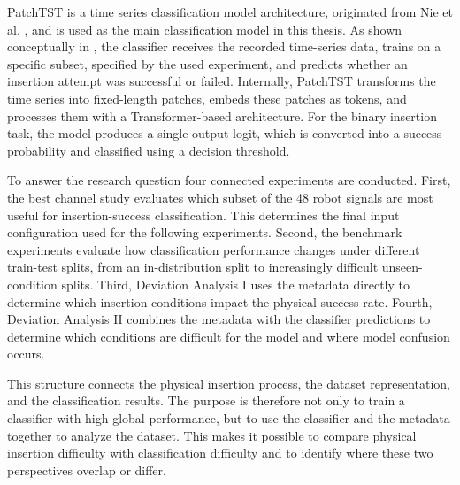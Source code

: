 PatchTST is a time series classification model architecture, originated from Nie et al. \cite{nieTimeSeriesWorth2023b}, and is used as the main classification model in this thesis. As shown conceptually in , the classifier receives the recorded time-series data, trains on a specific subset, specified by the used experiment, and predicts whether an insertion attempt was successful or failed. Internally, PatchTST transforms the time series into fixed-length patches, embeds these patches as tokens, and processes them with a Transformer-based architecture. For the binary insertion task, the model produces a single output logit, which is converted into a success probability and classified using a decision threshold.

To answer the research question four connected experiments are conducted. First, the best channel study evaluates which subset of the 48 robot signals are most useful for insertion-success classification. This determines the final input configuration used for the following experiments. Second, the benchmark experiments evaluate how classification performance changes under different train-test splits, from an in-distribution split to increasingly difficult unseen-condition splits. Third, Deviation Analysis I uses the metadata directly to determine which insertion conditions impact the physical success rate. Fourth, Deviation Analysis II combines the metadata with the classifier predictions to determine which conditions are difficult for the model and where model confusion occurs.

This structure connects the physical insertion process, the dataset representation, and the classification results. The purpose is therefore not only to train a classifier with high global performance, but to use the classifier and the metadata together to analyze the dataset. This makes it possible to compare physical insertion difficulty with classification difficulty and to identify where these two perspectives overlap or differ.



